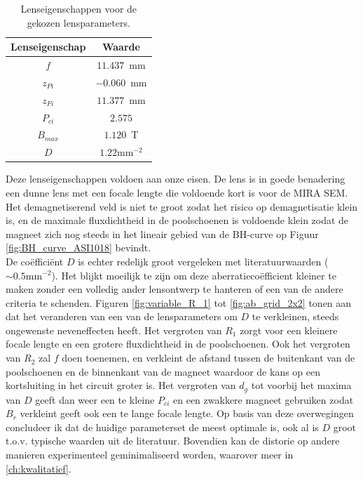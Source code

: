 \documentclass[we,twoside,openright,a4paper,11pt]{uantwerpenbamathesis}
\begin{document}
\begin{table}[H]
\centering
\begin{tabular}{@{}cl@{}}
\toprule
Lenseigenschap                     & \multicolumn{1}{c}{Waarde}  \\ \midrule
\multicolumn{1}{|c|}{$f$}        & \multicolumn{1}{c|}{$11.437$~mm}  \\ \midrule
\multicolumn{1}{|c|}{$z_{Pi}$}        & \multicolumn{1}{c|}{$-0.060$~mm} \\ \midrule
\multicolumn{1}{|c|}{$z_{Fi}$}        & \multicolumn{1}{c|}{$11.377$~mm}  \\ \midrule
\multicolumn{1}{|c|}{$P_{ci}$} & \multicolumn{1}{c|}{$2.575$}  \\ \midrule
\multicolumn{1}{|c|}{$B_{max}$} & \multicolumn{1}{c|}{$1.120$~T}    \\ \midrule
\multicolumn{1}{|c|}{$D$}        & \multicolumn{1}{c|}{$1.22\mathrm{mm}^{-2}$}    \\ \midrule
\end{tabular}
\caption{Lenseigenschappen voor de gekozen lensparameters.}\label{tab:lens_properties}
\end{table}

Deze lenseigenschappen voldoen aan onze eisen. De lens is in goede benadering een dunne lens met een focale lengte die voldoende kort is voor de MIRA SEM. Het demagnetiserend veld is niet te groot zodat het risico op demagnetisatie klein is, en de maximale fluxdichtheid in de poolschoenen is voldoende klein zodat de magneet zich nog steeds in het lineair gebied van de $\mathrm{BH}$-curve op Figuur \ref{fig:BH_curve_ASI1018} bevindt.\\

De coëfficiënt $D$ is echter redelijk groot vergeleken met literatuurwaarden ($\sim 0.5\mathrm{mm}^{-2}$). Het blijkt moeilijk te zijn om deze aberratiecoëfficient kleiner te maken zonder een volledig ander lensontwerp te hanteren of een van de andere criteria te schenden. Figuren \ref{fig:variable_R_1} tot \ref{fig:ab_grid_2x2} tonen aan dat het veranderen van een van de lensparameters om $D$ te verkleinen, steeds ongewenste neveneffecten heeft. Het vergroten van $R_1$ zorgt voor een kleinere focale lengte en een grotere fluxdichtheid in de poolschoenen. Ook het vergroten van $R_2$ zal $f$ doen toenemen, en verkleint de afstand tussen de buitenkant van de poolschoenen en de binnenkant van de magneet waardoor de kans op een kortsluiting in het circuit groter is. Het vergroten van $d_g$ tot voorbij het maxima van $D$ geeft dan weer een te kleine $P_{ci}$ en een zwakkere magneet gebruiken zodat $B_r$ verkleint geeft ook een te lange focale lengte. Op basis van deze overwegingen concludeer ik dat de huidige parameterset de meest optimale is, ook al is $D$ groot t.o.v. typische waarden uit de literatuur. Bovendien kan de distorie op andere manieren experimenteel geminimaliseerd worden, waarover meer in \ref{ch:kwalitatief}.\\
\end{document}
